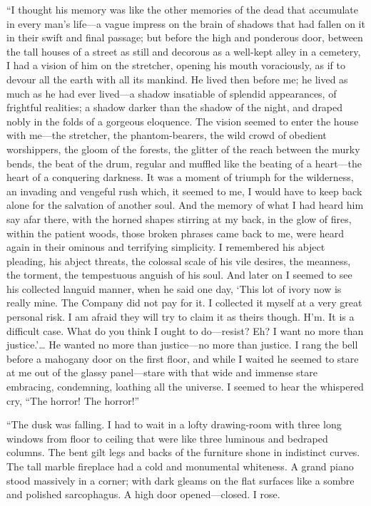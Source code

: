 \documentclass[12pt]{report}
\begin{document}
``I thought his memory was like the other memories of the dead that
accumulate in every man's life---a vague impress on the brain of shadows
that had fallen on it in their swift and final passage; but before the
high and ponderous door, between the tall houses of a street as still
and decorous as a well-kept alley in a cemetery, I had a vision of him
on the stretcher, opening his mouth voraciously, as if to devour all the
earth with all its mankind. He lived then before me; he lived as much as
he had ever lived---a shadow insatiable of splendid appearances, of
frightful realities; a shadow darker than the shadow of the night, and
draped nobly in the folds of a gorgeous eloquence. The vision seemed to
enter the house with me---the stretcher, the phantom-bearers, the wild
crowd of obedient worshippers, the gloom of the forests, the glitter of
the reach between the murky bends, the beat of the drum, regular and
muffled like the beating of a heart---the heart of a conquering
darkness. It was a moment of triumph for the wilderness, an invading and
vengeful rush which, it seemed to me, I would have to keep back alone
for the salvation of another soul. And the memory of what I had heard
him say afar there, with the horned shapes stirring at my back, in the
glow of fires, within the patient woods, those broken phrases came back
to me, were heard again in their ominous and terrifying simplicity. I
remembered his abject pleading, his abject threats, the colossal scale
of his vile desires, the meanness, the torment, the tempestuous anguish
of his soul. And later on I seemed to see his collected languid manner,
when he said one day, `This lot of ivory now is really mine. The Company
did not pay for it. I collected it myself at a very great personal risk.
I am afraid they will try to claim it as theirs though. H'm. It is a
difficult case. What do you think I ought to do---resist? Eh? I want no
more than justice.'\ldots{} He wanted no more than justice---no more
than justice. I rang the bell before a mahogany door on the first floor,
and while I waited he seemed to stare at me out of the glassy
panel---stare with that wide and immense stare embracing, condemning,
loathing all the universe. I seemed to hear the whispered cry, ``The
horror! The horror!''

``The dusk was falling. I had to wait in a lofty drawing-room with three
long windows from floor to ceiling that were like three luminous and
bedraped columns. The bent gilt legs and backs of the furniture shone in
indistinct curves. The tall marble fireplace had a cold and monumental
whiteness. A grand piano stood massively in a corner; with dark gleams
on the flat surfaces like a sombre and polished sarcophagus. A high door
opened---closed. I rose.
\end{document}

